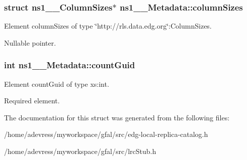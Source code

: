 \subsubsection{\setlength{\rightskip}{0pt plus 5cm}struct \bf{ns1\_\-\_\-Column\-Sizes}$\ast$ \bf{ns1\_\-\_\-Metadata::column\-Sizes}}\label{structns1____Metadata_d337db8cc3d23fa8d7fe7d23de2bc6cb}


Element column\-Sizes of type \char`\"{}http://rls.data.edg.org\char`\"{}:Column\-Sizes. 

Nullable pointer. 
\subsubsection{\setlength{\rightskip}{0pt plus 5cm}int \bf{ns1\_\-\_\-Metadata::count\-Guid}}\label{structns1____Metadata_3b53e7f95c2570be18bfa980e081a102}


Element count\-Guid of type xs:int. 

Required element. 

The documentation for this struct was generated from the following files:\begin{CompactItemize}
\item 
/home/adevress/myworkspace/gfal/src/edg-local-replica-catalog.h\item 
/home/adevress/myworkspace/gfal/src/lrc\-Stub.h\end{CompactItemize}
